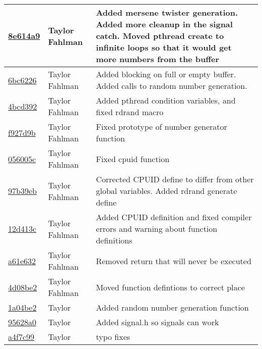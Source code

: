 \begin{tabular}{l l l}
\href{git@github.com:fahlmant/cs444/commit/8e614a90d9b3adfedea1214253801c36f17c6aea}{8e614a9} & Taylor Fahlman & Added mersene twister generation. Added more cleanup in the signal catch. Moved pthread create to infinite loops so that it would get more numbers from the buffer\\\hline
\href{git@github.com:fahlmant/cs444/commit/6bc6226e01a9a1302c741331cce8ab8256f399ce}{6bc6226} & Taylor Fahlman & Added blocking on full or empty buffer. Added calls to random number generation.\\\hline
\href{git@github.com:fahlmant/cs444/commit/4bcd392bf2941eb49cc82229be9495cd4c9f62ee}{4bcd392} & Taylor Fahlman & Added pthread condition variables, and fixed rdrand macro\\\hline
\href{git@github.com:fahlmant/cs444/commit/f927d9b39907620e959c235c9b56ab0160bbc366}{f927d9b} & Taylor Fahlman & Fixed prototype of number generator function\\\hline
\href{git@github.com:fahlmant/cs444/commit/056005ccb725e1ce91c211bb5cc71acdd3cfe5e4}{056005c} & Taylor Fahlman & Fixed cpuid function\\\hline
\href{git@github.com:fahlmant/cs444/commit/97b39ebde5ea4090c9371d7868ec9984c6230703}{97b39eb} & Taylor Fahlman & Corrected CPUID define to differ from other global variables. Added rdrand generate define\\\hline
\href{git@github.com:fahlmant/cs444/commit/12d413cdbc773bea9797fbc8ffc523df368cae5c}{12d413c} & Taylor Fahlman & Added CPUID definition and fixed compiler errors and warning about function definitions\\\hline
\href{git@github.com:fahlmant/cs444/commit/a61e6320173be1ea668966396bb45bc7930d34f9}{a61e632} & Taylor Fahlman & Removed return that will never be executed\\\hline
\href{git@github.com:fahlmant/cs444/commit/4d08be28f8900f197846be9ac81d7c0d4c45cc03}{4d08be2} & Taylor Fahlman & Moved function defintions to correct place\\\hline
\href{git@github.com:fahlmant/cs444/commit/1a04be2d025bdf2f264d2fdcd2dad95ded4fb324}{1a04be2} & Taylor & Added random number generation function\\\hline
\href{git@github.com:fahlmant/cs444/commit/95628a0549663a27c0a3ef1f04118db28e89acda}{95628a0} & Taylor & Added signal.h so signals can work\\\hline
\href{git@github.com:fahlmant/cs444/commit/a4f7c992ec397d9b510126246137537b77e55930}{a4f7c99} & Taylor & typo fixes\\\hline

\end{tabular}
